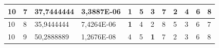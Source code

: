 \documentclass[conference]{IEEEtran}
\begin{document}
\begin{table}[]
\begin{tabular}{|llll|llllllll|}
\multicolumn{1}{|l|}{10}                                                    & \multicolumn{1}{l|}{7}                                                        & \multicolumn{1}{l|}{37,7444444}                                                   & 3,3887E-06                     & \multicolumn{1}{l|}{\textbf{1}}                                         & \multicolumn{1}{l|}{5}                                                  & \multicolumn{1}{l|}{3}                                                  & \multicolumn{1}{l|}{7}                                                  & \multicolumn{1}{l|}{2}                                                  & \multicolumn{1}{l|}{4}                                                  & \multicolumn{1}{l|}{6}                                                  & 8                          \\ \hline
\multicolumn{1}{|l|}{10}                                                    & \multicolumn{1}{l|}{8}                                                        & \multicolumn{1}{l|}{35,9444444}                                                   & 7,4264E-06                     & \multicolumn{1}{l|}{\textbf{1}}                                         & \multicolumn{1}{l|}{4}                                                  & \multicolumn{1}{l|}{2}                                                  & \multicolumn{1}{l|}{8}                                                  & \multicolumn{1}{l|}{5}                                                  & \multicolumn{1}{l|}{3}                                                  & \multicolumn{1}{l|}{6}                                                  & 7                          \\ \hline
\multicolumn{1}{|l|}{10}                                                    & \multicolumn{1}{l|}{9}                                                        & \multicolumn{1}{l|}{50,2888889}                                                   & 1,2676E-08                     & \multicolumn{1}{l|}{4}                                                  & \multicolumn{1}{l|}{5}                                                  & \multicolumn{1}{l|}{\textbf{1}}                                         & \multicolumn{1}{l|}{7}                                                  & \multicolumn{1}{l|}{2}                                                  & \multicolumn{1}{l|}{3}                                                  & \multicolumn{1}{l|}{6}                                                  & 8                          \\ \hline

\end{tabular}
\end{table}
\end{document}

